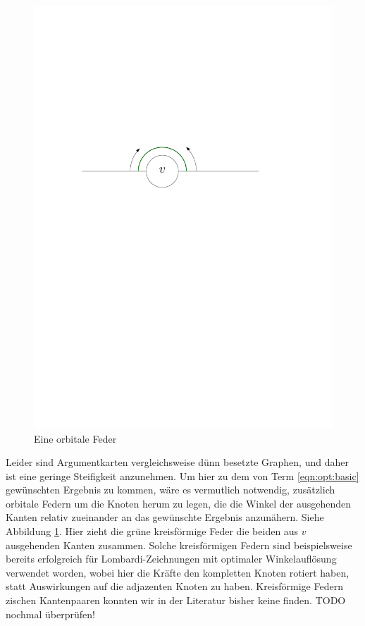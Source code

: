 \begin{figure}
	\centering
	\includegraphics{figures/orbitalspring.pdf}
	\caption{Eine orbitale Feder}
	\label{fig:orbitalspring}
\end{figure}

Leider sind Argumentkarten vergleichsweise dünn besetzte Graphen, und daher ist eine geringe Steifigkeit anzunehmen. Um hier zu dem von Term \ref{eqn:opt:basic} gewünschten Ergebnis zu kommen, wäre es vermutlich notwendig, zusätzlich orbitale Federn um die Knoten herum zu legen, die die Winkel der ausgehenden Kanten relativ zueinander an das gewünschte Ergebnis anzunähern. Siehe Abbildung \ref{fig:orbitalspring}. Hier zieht die grüne kreisförmige Feder die beiden aus $v$ ausgehenden Kanten zusammen. Solche kreisförmigen Federn sind beispielsweise bereits erfolgreich für Lombardi-Zeichnungen mit optimaler Winkelauflösung verwendet worden\cite{chernobelskiy2012force}, wobei hier die Kräfte den kompletten Knoten rotiert haben, statt Auswirkungen auf die adjazenten Knoten zu haben. Kreisförmige Federn zischen Kantenpaaren konnten wir in der Literatur bisher keine finden. TODO nochmal überprüfen!

